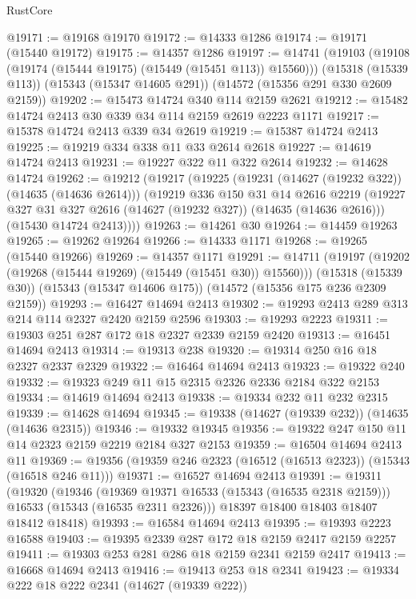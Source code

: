 \begin{lexlean}{RustCore}
\begin{coremodule}
@19171 := @19168 @19170
@19172 := @14333 @1286
@19174 := @19171 (@15440 @19172)
@19175 := @14357 @1286
@19197 := @14741
    (@19103 (@19108 (@19174 (@15444 @19175) (@15449 (@15451 @113)) @15560)))
    (@15318 (@15339 @113))
    (@15343 (@15347 @14605 @291))
    (@14572 (@15356 @291 @330 @2609 @2159))
@19202 := @15473 @14724 @340 @114 @2159 @2621
@19212 := @15482 @14724 @2413 @30 @339 @34 @114 @2159 @2619 @2223 @1171
@19217 := @15378 @14724 @2413 @339 @34 @2619
@19219 := @15387 @14724 @2413
@19225 := @19219 @334 @338 @11 @33 @2614 @2618
@19227 := @14619 @14724 @2413
@19231 := @19227 @322 @11 @322 @2614
@19232 := @14628 @14724
@19262 := @19212
    (@19217
      (@19225
        (@19231 (@14627 (@19232 @322)) (@14635 (@14636 @2614)))
        (@19219
          @336
          @150
          @31
          @14
          @2616
          @2219
          (@19227 @327 @31 @327 @2616 (@14627 (@19232 @327)) (@14635 (@14636 @2616)))
          (@15430 @14724 @2413))))
@19263 := @14261 @30
@19264 := @14459 @19263
@19265 := @19262 @19264
@19266 := @14333 @1171
@19268 := @19265 (@15440 @19266)
@19269 := @14357 @1171
@19291 := @14711
    (@19197 (@19202 (@19268 (@15444 @19269) (@15449 (@15451 @30)) @15560)))
    (@15318 (@15339 @30))
    (@15343 (@15347 @14606 @175))
    (@14572 (@15356 @175 @236 @2309 @2159))
@19293 := @16427 @14694 @2413
@19302 := @19293 @2413 @289 @313 @214 @114 @2327 @2420 @2159 @2596
@19303 := @19293 @2223
@19311 := @19303 @251 @287 @172 @18 @2327 @2339 @2159 @2420
@19313 := @16451 @14694 @2413
@19314 := @19313 @238
@19320 := @19314 @250 @16 @18 @2327 @2337 @2329
@19322 := @16464 @14694 @2413
@19323 := @19322 @240
@19332 := @19323 @249 @11 @15 @2315 @2326 @2336 @2184 @322 @2153
@19334 := @14619 @14694 @2413
@19338 := @19334 @232 @11 @232 @2315
@19339 := @14628 @14694
@19345 := @19338 (@14627 (@19339 @232)) (@14635 (@14636 @2315))
@19346 := @19332 @19345
@19356 := @19322 @247 @150 @11 @14 @2323 @2159 @2219 @2184 @327 @2153
@19359 := @16504 @14694 @2413 @11
@19369 := @19356 (@19359 @246 @2323 (@16512 (@16513 @2323)) (@15343 (@16518 @246 @11)))
@19371 := @16527 @14694 @2413
@19391 := @19311
    (@19320
      (@19346
        (@19369 @19371 @16533 (@15343 (@16535 @2318 @2159)))
        @16533
        (@15343 (@16535 @2311 @2326)))
      @18397
      @18400
      @18403
      @18407
      @18412
      @18418)
@19393 := @16584 @14694 @2413
@19395 := @19393 @2223 @16588
@19403 := @19395 @2339 @287 @172 @18 @2159 @2417 @2159 @2257
@19411 := @19303 @253 @281 @286 @18 @2159 @2341 @2159 @2417
@19413 := @16668 @14694 @2413
@19416 := @19413 @253 @18 @2341
@19423 := @19334 @222 @18 @222 @2341 (@14627 (@19339 @222))

\end{coremodule}
\end{lexlean}
